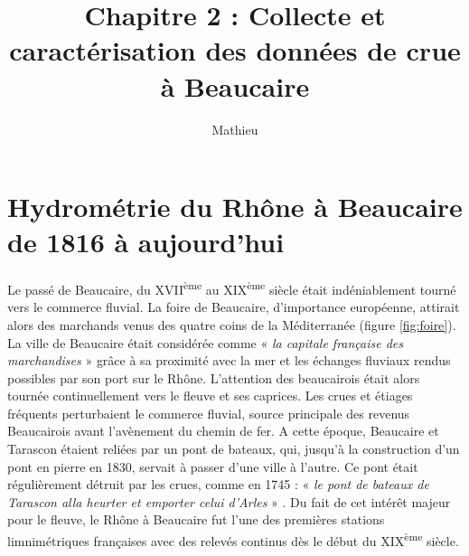 \documentclass[11pt]{article}
\title{Chapitre 2 : Collecte et caractérisation des données de crue à Beaucaire}
\author{Mathieu}
\begin{document}
\maketitle


\tableofcontents


\newpage 


\section{Hydrométrie du Rhône à Beaucaire de 1816 à aujourd'hui}
\label{sec:hydrometrie}

\paragraph{} Le passé de Beaucaire, du XVII\textsuperscript{ème} au XIX\textsuperscript{ème} siècle était indéniablement tourné vers le commerce fluvial. La foire de Beaucaire, d'importance européenne, attirait alors des marchands venus des quatre coins de la Méditerranée (figure \ref{fig:foire}). La ville de Beaucaire était considérée comme « \textit{la capitale française des marchandises} » \citep{leon_vie_1953} grâce à sa proximité avec la mer et les échanges fluviaux rendus possibles par son port sur le Rhône. L'attention des beaucairois était alors tournée continuellement vers le fleuve et ses caprices. Les crues et étiages fréquents perturbaient le commerce fluvial, source principale des revenus Beaucairois avant l'avènement du chemin de fer. A cette époque, Beaucaire et Tarascon étaient reliées par un pont de bateaux, qui, jusqu'à la construction d'un pont en pierre en 1830, servait à passer d'une ville à l'autre. Ce pont était régulièrement détruit par les crues, comme en 1745 : « \textit{le pont de bateaux de Tarascon alla heurter et emporter celui d'Arles} » \citep{anibert_annales_1764}. Du fait de cet intérêt majeur pour le fleuve, le Rhône à Beaucaire fut l'une des premières stations limnimétriques françaises avec des relevés continus dès le début du XIX\textsuperscript{ème} siècle. 
\end{document}
